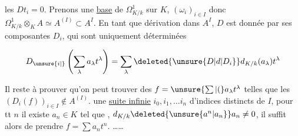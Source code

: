 
les $Dt_i=0$.  Prenons une \uline{base} de $\Omega^1_{K/k}$ sur $K$,  $(\omega_i)_{i\in I}$ donc $\Omega^1_{K/k}\otimes_K A\simeq A^{(I)}\subset A^I$. En tant que dérivation dans $A^I$, $D$ est donnée par ses composantes $D_i$, qui sont uniquement déterminées

\[ D_{\unsure{i|\vphantom{i}}}\left(\sum_\lambda a_\lambda t^\lambda\right)=\sum_\lambda\deleted{\unsure{D|d|D_i}}d_{K/k}(a_\lambda)t^\lambda \]

Il reste à prouver qu'on peut trouver des $f=\unsure{\sum|(}a_\lambda t^\lambda$ telles que les $(D_i(f))_{i\in I}\notin A^{(I)}$.       une \uline{suite infinie} $i_0,i_1,\ldots i_n$ d'indices distincts de $I$,  pour tt $n$ il existe $a_n\in K$ tel que  ,  $d_{K/k}\deleted{\unsure{a^n|a_n}}a_n\ne0$, il suffit alors de prendre $f=\sum a_n t^n$. \ldots\ldots
